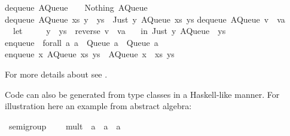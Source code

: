 \begin{isabellebody}
\begin{isamarkuptext}
dequeue\ {\isacharparenleft}AQueue\ {\isacharbrackleft}{\isacharbrackright}\ {\isacharbrackleft}{\isacharbrackright}{\isacharparenright}\ {\isacharequal}\ {\isacharparenleft}Nothing{\isacharcomma}\ AQueue\ {\isacharbrackleft}{\isacharbrackright}\ {\isacharbrackleft}{\isacharbrackright}{\isacharparenright}{\isacharsemicolon}\isanewline
dequeue\ {\isacharparenleft}AQueue\ xs\ {\isacharparenleft}y\ {\isacharcolon}\ ys{\isacharparenright}{\isacharparenright}\ {\isacharequal}\ {\isacharparenleft}Just\ y{\isacharcomma}\ AQueue\ xs\ ys{\isacharparenright}{\isacharsemicolon}\isanewline
dequeue\ {\isacharparenleft}AQueue\ {\isacharparenleft}v\ {\isacharcolon}\ va{\isacharparenright}\ {\isacharbrackleft}{\isacharbrackright}{\isacharparenright}\ {\isacharequal}\isanewline
\ \ let\ {\isacharbraceleft}\isanewline
\ \ \ \ {\isacharparenleft}y\ {\isacharcolon}\ ys{\isacharparenright}\ {\isacharequal}\ reverse\ {\isacharparenleft}v\ {\isacharcolon}\ va{\isacharparenright}{\isacharsemicolon}\isanewline
\ \ {\isacharbraceright}\ in\ {\isacharparenleft}Just\ y{\isacharcomma}\ AQueue\ {\isacharbrackleft}{\isacharbrackright}\ ys{\isacharparenright}{\isacharsemicolon}\isanewline
\isanewline
enqueue\ {\isacharcolon}{\isacharcolon}\ forall\ a{\isachardot}\ a\ {\isacharminus}{\isachargreater}\ Queue\ a\ {\isacharminus}{\isachargreater}\ Queue\ a{\isacharsemicolon}\isanewline
enqueue\ x\ {\isacharparenleft}AQueue\ xs\ ys{\isacharparenright}\ {\isacharequal}\ AQueue\ {\isacharparenleft}x\ {\isacharcolon}\ xs{\isacharparenright}\ ys{\isacharsemicolon}\isanewline
\isanewline
{\isacharbraceright}\isanewline%
\end{isamarkuptext}%
\isamarkuptrue%
%
\endisatagtypewriter
{\isafoldtypewriter}%
%
\isadelimtypewriter
%
\endisadelimtypewriter
%
\begin{isamarkuptext}%
\noindent For more details about \hyperlink{command.export-code}{\mbox{}} see
  .%
\end{isamarkuptext}%
\isamarkuptrue%
%
\isamarkuptrue%
%
\begin{isamarkuptext}%
Code can also be generated from type classes in a Haskell-like
  manner.  For illustration here an example from abstract algebra:%
\end{isamarkuptext}%
\isamarkuptrue%
%
\isadelimquote
%
\endisadelimquote
%
\isatagquote
{}\isamarkupfalse%
\ semigroup\ {\isacharequal}\isanewline
\ \ \ mult\ {\isacharcolon}{\isacharcolon}\ {\isachardoublequoteopen}{\isacharprime}a\ {\isasymRightarrow}\ {\isacharprime}a\ {\isasymRightarrow}\ {\isacharprime}a{\isachardoublequoteclose}\ {\isacharparenleft}\ {\isachardoublequoteopen}{\isasymotimes}{\isachardoublequoteclose}\ {}{}{\isacharparenright}\isanewline

\end{isabellebody}
